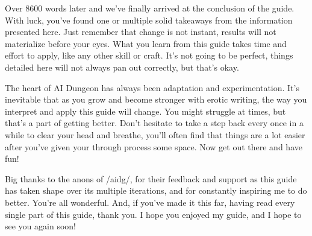 \documentclass[Source-main.tex]{subfiles}
\begin{document}
\clearpage


Over 8600 words later and we’ve finally arrived at the conclusion of the guide.
With luck, you’ve found one or multiple solid takeaways from the information presented here.
Just remember that change is not instant, results will not materialize before your eyes.
What you learn from this guide takes time and effort to apply, like any other skill or craft.
It’s not going to be perfect, things detailed here will not always pan out correctly, but that’s okay.

The heart of AI Dungeon has always been adaptation and experimentation.
It’s inevitable that as you grow and become stronger with erotic writing, the way you interpret and apply this guide will change.
You might struggle at times, but that’s a part of getting better.
Don’t hesitate to take a step back every once in a while to clear your head and breathe, you’ll often find that things are a lot easier after you’ve given your through process some space.
Now get out there and have fun!

Big thanks to the anons of /aidg/, for their feedback and support as this guide has taken shape over its multiple iterations, and for constantly inspiring me to do better.
You’re all wonderful.
And, if you’ve made it this far, having read every single part of this guide, thank you.
I hope you enjoyed my guide, and I hope to see you again soon!
\end{document}
